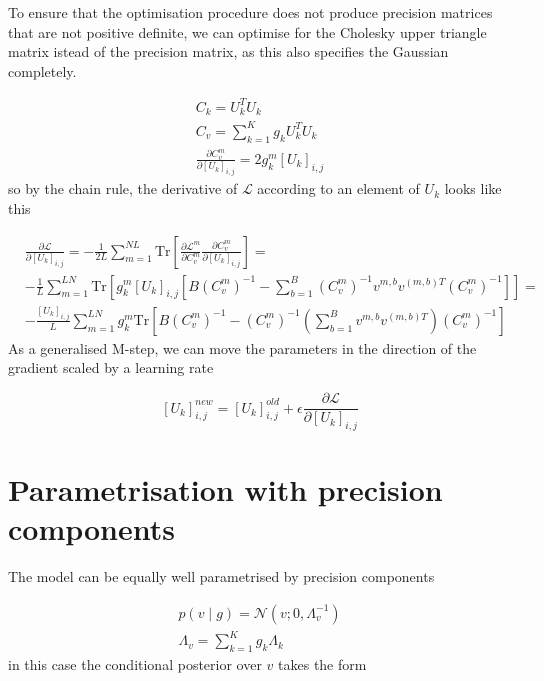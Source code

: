 \documentclass{paper}
\begin{document}
To ensure that the optimisation procedure does not produce precision matrices that are not positive definite, we can optimise for the Cholesky upper triangle matrix istead of the precision matrix, as this also specifies the Gaussian completely.

\begin{eqnarray}
C_k = U_k^T U_k \\
C_v = \sum_{k=1}^K g_k U_k^T U_k \\
\frac{\partial C_v^m}{\partial \left[ U_k \right]_{i,j}} = 2 g_k^m \left[ U_k \right]_{i,j}
\end{eqnarray}
%
so by the chain rule, the derivative of $\mathcal{L}$ according to an element of $U_k$ looks like this

\begin{equation}
\begin{split}
&\frac{\partial \mathcal{L}}{\partial \left[ U_k \right]_{i,j}} = -\frac{1}{2L} \sum_{m=1}^{NL} \textrm{Tr} \left[ \frac{\partial \mathcal{L}^m}{\partial C_v^m} \frac{\partial C_v^m}{\partial \left[ U_k \right]_{i,j}} \right] = \\
& -\frac{1}{L} \sum_{m=1}^{LN} \textrm{Tr} \left[ g_k^{m} \left[ U_k \right]_{i,j} \left[ B \left( C_v^m \right)^{-1} - \sum_{b=1}^B \left( C_v^m \right)^{-1} v^{m,b} v^{(m,b)T} \left( C_v^m \right)^{-1} \right] \right] = \\
& -\frac{ \left[ U_k \right]_{i,j}}{L} \sum_{m=1}^{LN} g_k^{m} \textrm{Tr} \left[ B \left( C_v^m \right)^{-1} -  \left( C_v^m \right)^{-1} \left( \sum_{b=1}^B v^{m,b} v^{(m,b)T} \right) \left( C_v^m \right)^{-1} \right]
\end{split}
\end{equation}
%
As a generalised M-step, we can move the parameters in the direction of the gradient scaled by a learning rate

\begin{equation}
\left[ U_k \right]_{i,j}^{new} = \left[ U_k \right]_{i,j}^{old} + \epsilon \frac{\partial \mathcal{L}}{\partial \left[ U_k \right]_{i,j}}
\end{equation}

\section{Parametrisation with precision components}

The model can be equally well parametrised by precision components

\begin{eqnarray}
p(v \mid g) = \mathcal{N}(v; 0,\Lambda_v^{-1}) \\
\Lambda_v = \sum_{k=1}^K g_k \Lambda_k \label{eq:cv}
\end{eqnarray}
%
in this case the conditional posterior over $v$ takes the form
\end{document}
